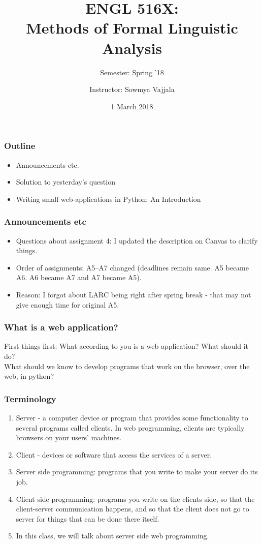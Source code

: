 \documentclass{beamer}
\author[Sowmya Vajjala]{Instructor: Sowmya Vajjala}
\title[ENGL 516X]{ENGL 516X: \\ Methods of Formal Linguistic Analysis}
\subtitle{Semester: Spring '18}
\date{1 March 2018}
\institute{Iowa State University, USA}
\begin{document}
\begin{frame}\titlepage
\end{frame}

\begin{frame}
\frametitle{Outline}
\begin{itemize}
\item Announcements etc.
\item Solution to yesterday's question
\item Writing small web-applications in Python: An Introduction
\end{itemize}
\end{frame}

\begin{frame}
\frametitle{Announcements etc}
\begin{itemize}
\item Questions about assignment 4: I updated the description on Canvas to clarify things. \pause
\item Order of assignments: A5--A7 changed (deadlines remain same. A5 became A6. A6 became A7 and A7 became A5).
\item Reason: I forgot about LARC being right after spring break - that may not give enough time for original A5.
\end{itemize}
\end{frame}

\begin{frame}
\frametitle{What is a web application?}
First things first: What according to you is a web-application? What should it do?
\pause \\ What should we know to develop programs that work on the browser, over the web, in python?
\end{frame}

\begin{frame}
\frametitle{Terminology}
\begin{enumerate}
\item Server - a computer device or program that provides some functionality to several programs called clients. In web programming, clients are typically browsers on your users' machines. 
\item Client - devices or software that access the services of a server.
\item Server side programming: programs that you write to make your server do its job.
\item Client side programming: programs you write on the clients side, so that the client-server communication happens, and so that the client does not go to server for things that can be done there itself.
\item In this class, we will talk about server side web programming.
\end{enumerate}
\end{frame}
\end{document}
